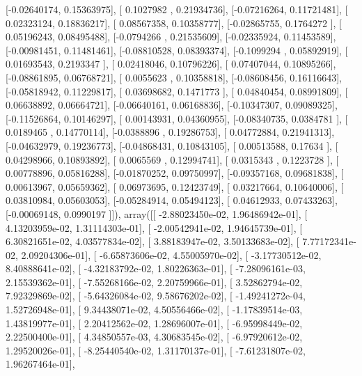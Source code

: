 \documentclass{article}
\begin{document}
       [-0.02640174,  0.15363975],
       [ 0.1027982 ,  0.21934736],
       [-0.07216264,  0.11721481],
       [ 0.02323124,  0.18836217],
       [ 0.08567358,  0.10358777],
       [-0.02865755,  0.1764272 ],
       [ 0.05196243,  0.08495488],
       [-0.0794266 ,  0.21535609],
       [-0.02335924,  0.11453589],
       [-0.00981451,  0.11481461],
       [-0.08810528,  0.08393374],
       [-0.1099294 ,  0.05892919],
       [ 0.01693543,  0.2193347 ],
       [ 0.02418046,  0.10796226],
       [ 0.07407044,  0.10895266],
       [-0.08861895,  0.06768721],
       [ 0.0055623 ,  0.10358818],
       [-0.08608456,  0.16116643],
       [-0.05818942,  0.11229817],
       [ 0.03698682,  0.1471773 ],
       [ 0.04840454,  0.08991809],
       [ 0.06638892,  0.06664721],
       [-0.06640161,  0.06168836],
       [-0.10347307,  0.09089325],
       [-0.11526864,  0.10146297],
       [ 0.00143931,  0.04360955],
       [-0.08340735,  0.0384781 ],
       [ 0.0189465 ,  0.14770114],
       [-0.0388896 ,  0.19286753],
       [ 0.04772884,  0.21941313],
       [-0.04632979,  0.19236773],
       [-0.04868431,  0.10843105],
       [ 0.00513588,  0.17634   ],
       [ 0.04298966,  0.10893892],
       [ 0.0065569 ,  0.12994741],
       [ 0.0315343 ,  0.1223728 ],
       [ 0.00778896,  0.05816288],
       [-0.01870252,  0.09750997],
       [-0.09357168,  0.09681838],
       [ 0.00613967,  0.05659362],
       [ 0.06973695,  0.12423749],
       [ 0.03217664,  0.10640006],
       [ 0.03810984,  0.05603053],
       [-0.05284914,  0.05494123],
       [ 0.04612933,  0.07433263],
       [-0.00069148,  0.0990197 ]]), array([[ -2.88023450e-02,   1.96486942e-01],
       [  4.13203959e-02,   1.31114303e-01],
       [ -2.00542941e-02,   1.94645739e-01],
       [  6.30821651e-02,   4.03577834e-02],
       [  3.88183947e-02,   3.50133683e-02],
       [  7.77172341e-02,   2.09204306e-01],
       [ -6.65873606e-02,   4.55005970e-02],
       [ -3.17730512e-02,   8.40888641e-02],
       [ -4.32183792e-02,   1.80226363e-01],
       [ -7.28096161e-03,   2.15539362e-01],
       [ -7.55268166e-02,   2.20759966e-01],
       [  3.52862794e-02,   7.92329869e-02],
       [ -5.64326084e-02,   9.58676202e-02],
       [ -1.49241272e-04,   1.52726948e-01],
       [  9.34438071e-02,   4.50556466e-02],
       [ -1.17839514e-03,   1.43819977e-01],
       [  2.20412562e-02,   1.28696007e-01],
       [ -6.95998449e-02,   2.22500400e-01],
       [  4.34850557e-03,   4.30683545e-02],
       [ -6.97920612e-02,   1.29520026e-01],
       [ -8.25440540e-02,   1.31170137e-01],
       [ -7.61231807e-02,   1.96267464e-01],
\end{document}
